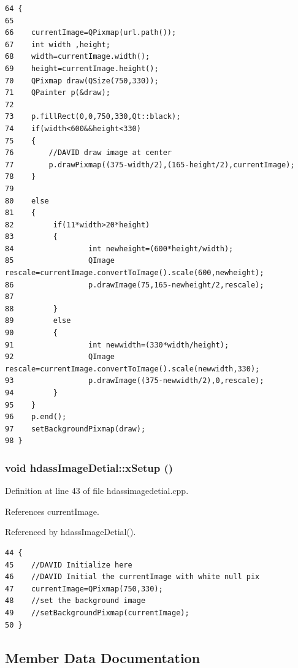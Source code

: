 \footnotesize\begin{verbatim}64 {
65 
66    currentImage=QPixmap(url.path());
67    int width ,height;
68    width=currentImage.width();
69    height=currentImage.height();
70    QPixmap draw(QSize(750,330));
71    QPainter p(&draw);
72 
73    p.fillRect(0,0,750,330,Qt::black);
74    if(width<600&&height<330)
75    {
76        //DAVID draw image at center
77        p.drawPixmap((375-width/2),(165-height/2),currentImage);
78    }
79 
80    else
81    {
82         if(11*width>20*height)
83         {
84                 int newheight=(600*height/width);
85                 QImage rescale=currentImage.convertToImage().scale(600,newheight);
86                 p.drawImage(75,165-newheight/2,rescale);
87                 
88         }
89         else
90         {
91                 int newwidth=(330*width/height);
92                 QImage rescale=currentImage.convertToImage().scale(newwidth,330);
93                 p.drawImage((375-newwidth/2),0,rescale);
94         }
95    }    
96    p.end();
97    setBackgroundPixmap(draw);
98 }
\end{verbatim}\normalsize 
{}
\subsubsection{\setlength{\rightskip}{0pt plus 5cm}void hdass\-Image\-Detial::x\-Setup ()}\label{classhdassImageDetial_hdassImageDetiala1}




Definition at line 43 of file hdassimagedetial.cpp.

References current\-Image.

Referenced by hdass\-Image\-Detial().



\footnotesize\begin{verbatim}44 {
45    //DAVID Initialize here
46    //DAVID Initial the currentImage with white null pix
47    currentImage=QPixmap(750,330);
48    //set the background image
49    //setBackgroundPixmap(currentImage);
50 }
\end{verbatim}\normalsize 


\subsection{Member Data Documentation}
